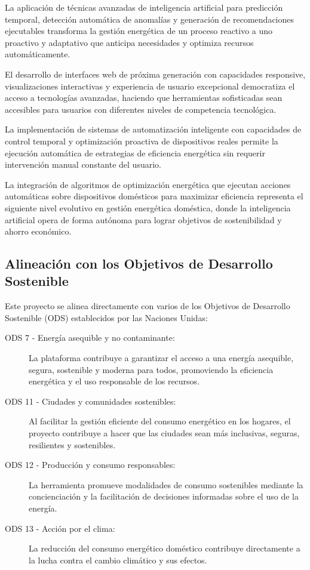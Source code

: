 La aplicación de técnicas avanzadas de inteligencia artificial para predicción temporal, detección automática de anomalías y generación de recomendaciones ejecutables transforma la gestión energética de un proceso reactivo a uno proactivo y adaptativo que anticipa necesidades y optimiza recursos automáticamente.

El desarrollo de interfaces web de próxima generación con capacidades responsive, visualizaciones interactivas y experiencia de usuario excepcional democratiza el acceso a tecnologías avanzadas, haciendo que herramientas sofisticadas sean accesibles para usuarios con diferentes niveles de competencia tecnológica.

La implementación de sistemas de automatización inteligente con capacidades de control temporal y optimización proactiva de dispositivos reales permite la ejecución automática de estrategias de eficiencia energética sin requerir intervención manual constante del usuario.

La integración de algoritmos de optimización energética que ejecutan acciones automáticas sobre dispositivos domésticos para maximizar eficiencia representa el siguiente nivel evolutivo en gestión energética doméstica, donde la inteligencia artificial opera de forma autónoma para lograr objetivos de sostenibilidad y ahorro económico.

\subsection{Alineación con los Objetivos de Desarrollo Sostenible}

Este proyecto se alinea directamente con varios de los Objetivos de Desarrollo Sostenible (ODS) establecidos por las Naciones Unidas:

\begin{description}
    \item[ODS 7 - Energía asequible y no contaminante:] La plataforma contribuye a garantizar el acceso a una energía asequible, segura, sostenible y moderna para todos, promoviendo la eficiencia energética y el uso responsable de los recursos.
    
    \item[ODS 11 - Ciudades y comunidades sostenibles:] Al facilitar la gestión eficiente del consumo energético en los hogares, el proyecto contribuye a hacer que las ciudades sean más inclusivas, seguras, resilientes y sostenibles.
    
    \item[ODS 12 - Producción y consumo responsables:] La herramienta promueve modalidades de consumo sostenibles mediante la concienciación y la facilitación de decisiones informadas sobre el uso de la energía.
    
    \item[ODS 13 - Acción por el clima:] La reducción del consumo energético doméstico contribuye directamente a la lucha contra el cambio climático y sus efectos.
\end{description}

